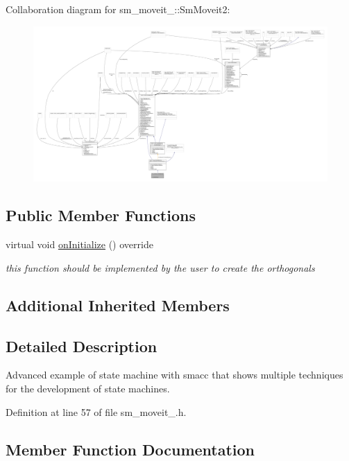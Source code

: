 Collaboration diagram for sm\+\_\+moveit\+\_\+:\+:Sm\+Moveit2\+:
\nopagebreak
\begin{figure}[H]
\begin{center}
\leavevmode
\includegraphics[width=350pt]{structsm__moveit__2_1_1SmMoveit2__coll__graph}
\end{center}
\end{figure}
\subsection*{Public Member Functions}
\begin{DoxyCompactItemize}
\item 
virtual void \hyperlink{structsm__moveit__2_1_1SmMoveit2_a5ca07586ffb18f75b43430f15b28d4e2}{on\+Initialize} () override
\begin{DoxyCompactList}\small\item\em this function should be implemented by the user to create the orthogonals \end{DoxyCompactList}\end{DoxyCompactItemize}
\subsection*{Additional Inherited Members}


\subsection{Detailed Description}
Advanced example of state machine with smacc that shows multiple techniques for the development of state machines. 

Definition at line 57 of file sm\+\_\+moveit\+\_.\+h.



\subsection{Member Function Documentation}
\mbox{\label{structsm__moveit__2_1_1SmMoveit2_a5ca07586ffb18f75b43430f15b28d4e2}} 
